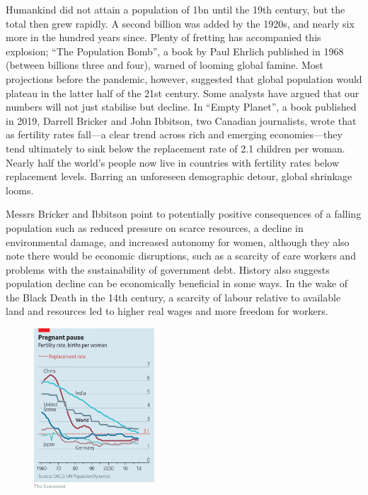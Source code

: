 \documentclass{article}
\begin{document}
Humankind did not attain a population of 1bn until the 19th century, but the total then grew rapidly. A second billion was added by the 1920s, and nearly six more in the hundred years since. Plenty of fretting has accompanied this explosion; ``The Population Bomb'', a book by Paul Ehrlich published in 1968 (between billions three and four), warned of looming global famine. Most projections before the pandemic, however, suggested that global population would plateau in the latter half of the 21st century. Some analysts have argued that our numbers will not just stabilise but decline. In ``Empty Planet'', a book published in 2019, Darrell Bricker and John Ibbitson, two Canadian journalists, wrote that as fertility rates fall---a clear trend across rich and emerging economies---they tend ultimately to sink below the replacement rate of 2.1 children per woman. Nearly half the world's people now live in countries with fertility rates below replacement levels. Barring an unforeseen demographic detour, global shrinkage looms. 

Messrs Bricker and Ibbitson point to potentially positive consequences of a falling population such as reduced pressure on scarce resources, a decline in environmental damage, and increased autonomy for women, although they also note there would be economic disruptions, such as a scarcity of care workers and problems with the sustainability of government debt. History also suggests population decline can be economically beneficial in some ways. In the wake of the Black Death in the 14th century, a scarcity of labour relative to available land and resources led to higher real wages and more freedom for workers. 

\begin{figure}[h]
\centering
\includegraphics[width=0.4\textwidth]{images/20210327_fnc293.png}
\end{figure}
\end{document}

